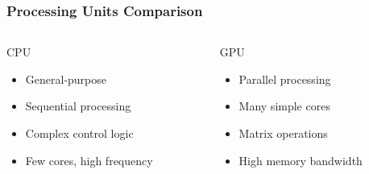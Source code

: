 \documentclass{beamer}
\begin{document}
\begin{frame}
    \frametitle{Processing Units Comparison}
    \begin{columns}[T]
        \begin{column}{0.45\textwidth}
            \begin{block}{CPU}
                \begin{itemize}
                    \item General-purpose
                    \item Sequential processing
                    \item Complex control logic
                    \item Few cores, high frequency
                \end{itemize}
            \end{block}
        \end{column}
        
        \begin{column}{0.45\textwidth}
            \begin{block}{GPU}
                \begin{itemize}
                    \item Parallel processing
                    \item Many simple cores
                    \item Matrix operations
                    \item High memory bandwidth
                \end{itemize}
            \end{block}
        \end{column}
    \end{columns}
\end{frame}
\end{document}

